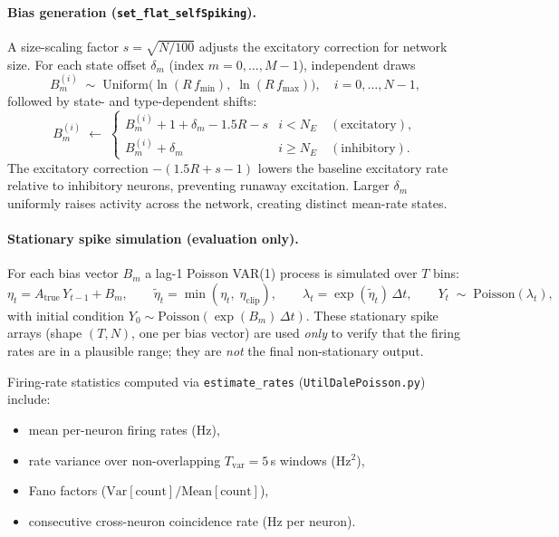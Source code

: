 \documentclass[11pt]{article}
\begin{document}
\paragraph{Bias generation (\texttt{set\_flat\_selfSpiking}).}
A size-scaling factor $s = \sqrt{N/100}$ adjusts the excitatory
correction for network size.
For each state offset $\delta_m$ (index $m = 0,\dots,M-1$),
independent draws
\begin{equation}
  B_m^{(i)} \;\sim\;
  \mathrm{Uniform}\!\bigl(\ln(R\,f_{\min}),\;\ln(R\,f_{\max})\bigr),
  \quad i = 0,\dots,N-1,
\end{equation}
followed by state- and type-dependent shifts:
\begin{equation}
  B_m^{(i)} \;\leftarrow\;
  \begin{cases}
    B_m^{(i)} + 1 + \delta_m - 1.5R - s
      & i < N_E \quad (\text{excitatory}), \\[4pt]
    B_m^{(i)} + \delta_m
      & i \geq N_E \quad (\text{inhibitory}).
  \end{cases}
  \label{eq:bias}
\end{equation}
The excitatory correction $-(1.5R + s - 1)$ lowers the baseline
excitatory rate relative to inhibitory neurons, preventing runaway
excitation.
Larger $\delta_m$ uniformly raises activity across the network,
creating distinct mean-rate states.

\paragraph{Stationary spike simulation (evaluation only).}
For each bias vector $B_m$ a lag-1 Poisson VAR(1) process is
simulated over $T$ bins:
\begin{equation}
  \eta_t = A_{\text{true}}\,Y_{t-1} + B_m,
  \qquad
  \tilde{\eta}_t = \min(\eta_t,\;\eta_{\mathrm{clip}}),
  \qquad
  \lambda_t = \exp(\tilde{\eta}_t)\,\Delta t,
  \qquad
  Y_t \;\sim\; \mathrm{Poisson}(\lambda_t),
  \label{eq:stationary}
\end{equation}
with initial condition $Y_0 \sim \mathrm{Poisson}(\exp(B_m)\,\Delta t)$.
These stationary spike arrays (shape $(T, N)$, one per bias vector)
are used \emph{only} to verify that the firing rates are in a
plausible range; they are \emph{not} the final non-stationary output.

Firing-rate statistics computed via \texttt{estimate\_rates}
(\texttt{UtilDalePoisson.py}) include:
\begin{itemize}
  \item mean per-neuron firing rates (Hz),
  \item rate variance over non-overlapping $T_{\mathrm{var}} = 5$\,s windows (Hz$^2$),
  \item Fano factors ($\mathrm{Var}[\text{count}] / \mathrm{Mean}[\text{count}]$),
  \item consecutive cross-neuron coincidence rate (Hz per neuron).
\end{itemize}
\end{document}
